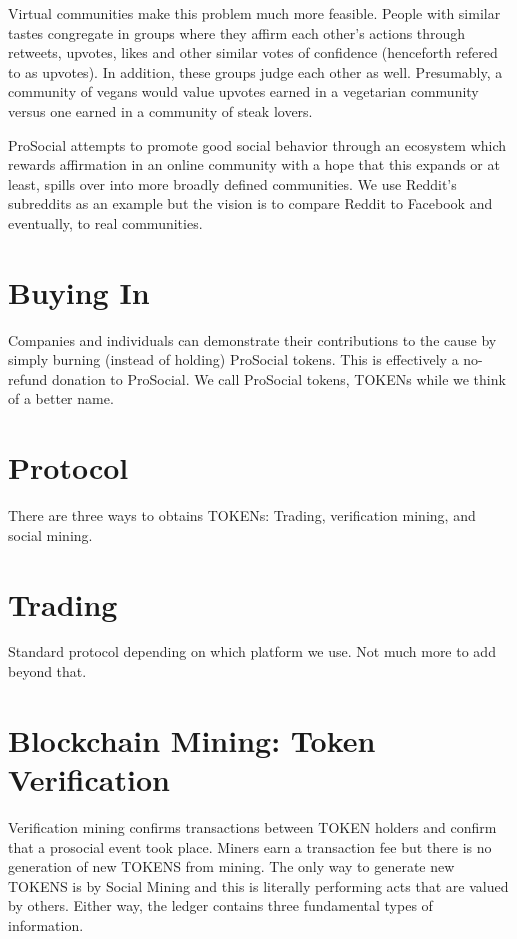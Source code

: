 \documentclass[12pt]{article}
\begin{document}
Virtual communities make this problem much more feasible. People with similar tastes congregate in groups where they affirm each other's actions through retweets, upvotes, likes and other similar votes of confidence (henceforth refered to as upvotes). In addition, these groups judge each other as well. Presumably, a community of vegans would value upvotes earned in a vegetarian community versus one earned in a community of steak lovers. 

ProSocial attempts to promote good social behavior through an ecosystem which rewards affirmation in an online community with a hope that this expands or at least, spills over into more broadly defined communities. We use Reddit's subreddits as an example but the vision is to compare Reddit to Facebook and eventually, to real communities.

\section*{Buying In}

Companies and individuals can demonstrate their contributions to the cause by simply burning (instead of holding) ProSocial tokens. This is effectively a no-refund donation to ProSocial. We call ProSocial tokens, TOKENs while we think of a better name. 

\section*{Protocol}

There are three ways to obtains TOKENs: Trading, verification mining, and social mining. 

\section*{Trading}

Standard protocol depending on which platform we use. Not much more to add beyond that.

\section*{Blockchain Mining: Token Verification}

Verification mining confirms transactions between TOKEN holders and confirm that a prosocial event took place. Miners earn a transaction fee but there is no generation of new TOKENS from mining. The only way to generate new TOKENS is by Social Mining and this is literally performing acts that are valued by others. Either way, the ledger contains three fundamental types of information.
\end{document}
